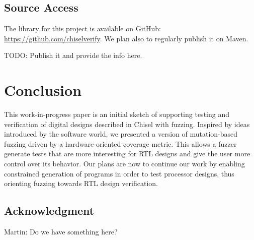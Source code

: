 \documentclass[conference]{IEEEtran}
\newcommand{\todo}[1]{{\color{olive} TODO: #1}}
\newcommand{\martin}[1]{{\color{blue} Martin: #1}}
\begin{document}
\subsection{Source Access}

The library for this project is available on GitHub:\\ \url{https://github.com/chiselverify}.
We plan also to regularly publish it on Maven.

\todo{Publish it and provide the info here.}


\section{Conclusion}
\label{sec:conclusion}

This work-in-progress paper is an initial sketch of supporting testing and verification
of digital designs described in Chisel with fuzzing. 
Inspired by ideas introduced by the software world, we presented a version of mutation-based fuzzing driven by a hardware-oriented coverage metric.
This allows a fuzzer generate tests that are more interesting for RTL designs and give the user more control over its behavior. 
Our plans are now to continue our work by enabling constrained generation of programs in order to test processor designs, thus orienting fuzzing towards RTL design verification.




\subsection*{Acknowledgment}

\martin{Do we have something here?}




\end{document}
